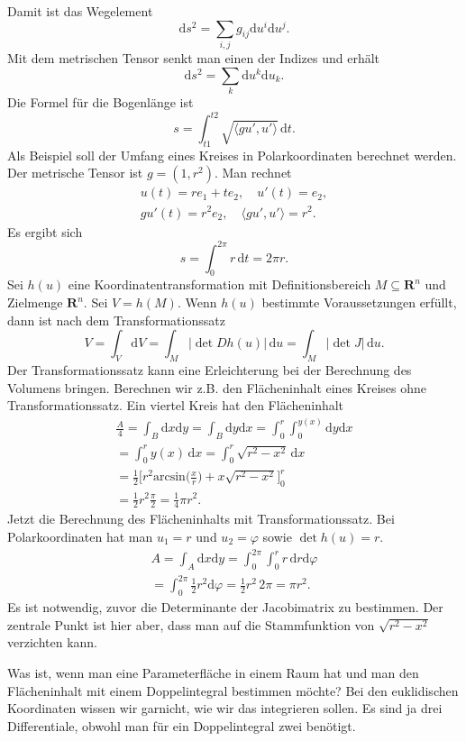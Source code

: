 \documentclass[a4paper,10pt,fleqn,twocolumn,twoside]{article}
\begin{document}
Damit ist das Wegelement
\[\mathrm ds^2 = \sum_{i,j} g_{ij}\mathrm du^i\mathrm du^j.\]
Mit dem metrischen Tensor senkt man einen der Indizes
und erhält
\[\mathrm ds^2 = \sum_{k}\mathrm du^k\mathrm du_k.\]
Die Formel für die Bogenlänge ist
\[s = \int_{t1}^{t2}
\sqrt{\langle gu',u'\rangle}\,\mathrm dt.\]
%
Als Beispiel soll der Umfang eines Kreises in Polarkoordinaten
berechnet werden. Der metrische Tensor ist \(g=(1,r^2)\).
Man rechnet
\begin{gather*}
u(t)=re_1+te_2,\quad
u'(t) = e_2,\\
gu'(t) = r^2e_2,\quad
\langle gu',u'\rangle = r^2.
\end{gather*}
Es ergibt sich
\[s = \int_0^{2\pi} r\,\mathrm dt = 2\pi r.\]
%
Sei \(h(u)\) eine Koordinatentransformation mit Definitionsbereich
\(M\subseteq\mathbf R^n\) und Zielmenge \(\mathbf R^n\).
Sei \(V=h(M)\). Wenn \(h(u)\) bestimmte Voraussetzungen erfüllt,
dann ist nach dem Transformationssatz
\[V = \int_V \mathrm dV = \int_M |{\det Dh(u)}|\,\mathrm du
= \int_M |{\det J}|\,\mathrm du.\]
Der Transformationssatz kann eine Erleichterung bei der Berechnung
des Volumens bringen. Berechnen wir z.B. den Flächeninhalt eines
Kreises ohne Transformationssatz. Ein viertel Kreis hat den
Flächeninhalt
\begin{gather*}
\frac{A}{4} = \int_B \mathrm dx\mathrm dy
= \int_B \mathrm dy\mathrm dx
= \int_{0}^r\int_{0}^{y(x)} \mathrm dy\mathrm dx\\
= \int_{0}^r y(x)\,\mathrm dx
= \int_{0}^r \sqrt{r^2-x^2}\,\mathrm dx\\
= \frac{1}{2}\Big[r^2\mathrm{arcsin}\Big(\frac{x}{r}\Big)
+ x\sqrt{r^2-x^2}\Big]_0^r\\
= \frac{1}{2} r^2 \frac{\pi}{2}
= \frac{1}{4}\pi r^2.
\end{gather*}
Jetzt die Berechnung des Flächeninhalts mit Transformationssatz.
Bei Polarkoordinaten hat man \(u_1=r\) und \(u_2=\varphi\)
sowie \(\det h(u)=r\).
\begin{gather*}
A = \int_A \mathrm dx\mathrm dy
= \int_0^{2\pi}\int_0^r r\,\mathrm dr\mathrm d\varphi\\
= \int_0^{2\pi} \frac{1}{2}r^2\mathrm d\varphi
= \frac{1}{2}r^2\,2\pi = \pi r^2.
\end{gather*}
Es ist notwendig, zuvor die Determinante der Jacobimatrix zu
bestimmen. Der zentrale Punkt ist hier aber, dass man auf die
Stammfunktion von \(\sqrt{r^2-x^2}\) verzichten kann.

Was ist, wenn man eine Parameterfläche in einem Raum hat und man den
Flächeninhalt mit einem Doppelintegral bestimmen möchte? Bei den
euklidischen Koordinaten wissen wir garnicht, wie wir das integrieren
sollen. Es sind ja drei Differentiale, obwohl man für ein
Doppelintegral zwei benötigt.
\end{document}
